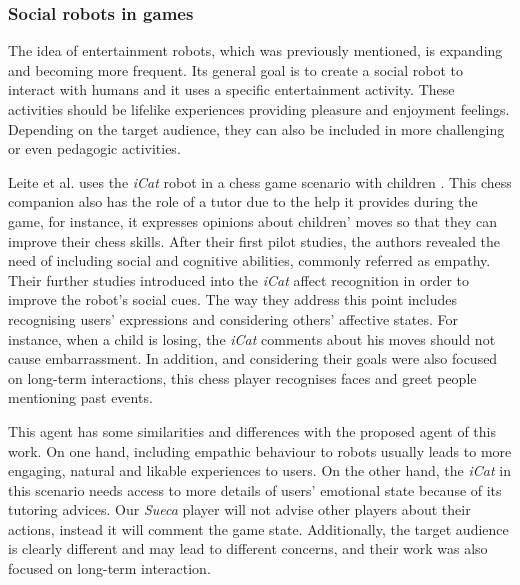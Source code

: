 \subsubsection{Social robots in games}

The idea of entertainment robots, which was previously mentioned, is expanding and becoming more frequent.
Its general goal is to create a social robot to interact with humans and it uses a specific entertainment activity.
These activities should be lifelike experiences providing pleasure and enjoyment feelings.
Depending on the target audience, they can also be included in more challenging or even pedagogic activities.

Leite et al. uses the \emph{iCat} robot in a chess game scenario with children \cite{Leitea,Castellano2010,Leite}.
This chess companion also has the role of a tutor due to the help it provides during the game, for instance, it expresses opinions about children' moves so that they can improve their chess skills.
After their first pilot studies, the authors revealed the need of including social and cognitive abilities, commonly referred as empathy.
Their further studies introduced into the \emph{iCat} affect recognition in order to improve the robot's social cues.
The way they address this point includes recognising users' expressions and considering others' affective states.
For instance, when a child is losing, the \emph{iCat} comments about his moves should not cause embarrassment.
In addition, and considering their goals were also focused on long-term interactions, this chess player recognises faces and greet people mentioning past events.

This agent has some similarities and differences with the proposed agent of this work.
On one hand, including empathic behaviour to robots usually leads to more engaging, natural and likable experiences to users.
On the other hand, the \emph{iCat} in this scenario needs access to more details of users' emotional state because of its tutoring advices. Our \emph{Sueca} player will not advise other players about their actions, instead it will comment the game state.
Additionally, the target audience is clearly different and may lead to different concerns, and their work was also focused on long-term interaction.



